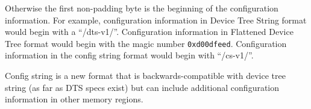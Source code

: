 Otherwise the first non-padding byte is the beginning of the
configuration information.  For example, configuration information in
Device Tree String format would begin with a ``/dts-v1/''.
Configuration information in Flattened Device Tree format would begin
with the magic number {\tt 0xd00dfeed}.  Configuration information in
the config string format would begin with ``/cs-v1/''.
\begin{commentary}
  Config string is a new format that is backwards-compatible with
  device tree string (as far as DTS specs exist) but can include
  additional configuration information in other memory regions.
\end{commentary}

